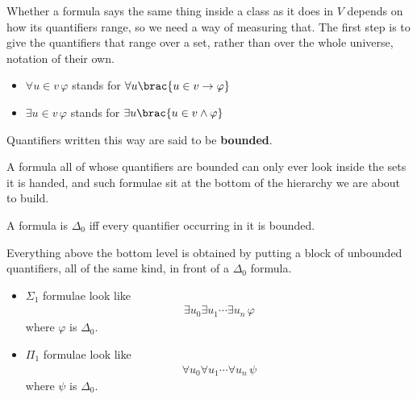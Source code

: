 Whether a formula says the same thing inside a class as it does in $V$ depends on how its quantifiers range, so we need a way of measuring that. The first step is to give the quantifiers that range over a set, rather than over the whole universe, notation of their own.

\begin{boxnotation} \hfill
    \begin{itemize}
        \item $\forall u \in v \, \varphi$ stands for $\forall u \brac{u \in v \to \varphi}$

        \item $\exists u \in v \, \varphi$ stands for $\exists u \brac{u \in v \land \varphi}$
    \end{itemize}
    Quantifiers written this way are said to be \textbf{bounded}.
\end{boxnotation}

A formula all of whose quantifiers are bounded can only ever look inside the sets it is handed, and such formulae sit at the bottom of the hierarchy we are about to build.

\begin{boxdefinition}
    A formula is $\Delta_0$ iff every quantifier occurring in it is bounded.
\end{boxdefinition}

Everything above the bottom level is obtained by putting a block of unbounded quantifiers, all of the same kind, in front of a $\Delta_0$ formula.

\begin{boxdefinition} \hfill
    \begin{itemize}
        \item $\Sigma_1$ formulae look like
        \begin{align*}
            \exists u_0 \exists u_1 \cdots \exists u_n \, \varphi
        \end{align*}
        where $\varphi$ is $\Delta_0$.

        \item $\Pi_1$ formulae look like
        \begin{align*}
            \forall u_0 \forall u_1 \cdots \forall u_n \, \psi
        \end{align*}
        where $\psi$ is $\Delta_0$.
    \end{itemize}
\end{boxdefinition}

